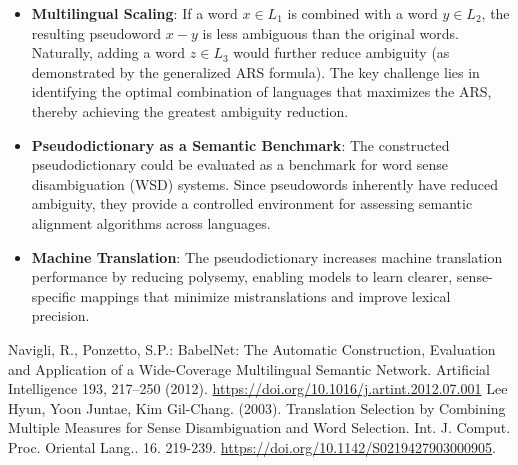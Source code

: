\documentclass[runningheads]{llncs}
\begin{document}
\begin{itemize}
\item \textbf{Multilingual Scaling}: If a word $x \in L_1$ is combined with a word $y \in L_2$, the resulting pseudoword $x-y$ is less ambiguous than the original words. Naturally, adding a word $z \in L_3$ would further reduce ambiguity (as demonstrated by the generalized ARS formula). The key challenge lies in identifying the optimal combination of languages that maximizes the ARS, thereby achieving the greatest ambiguity reduction.
  \item \textbf{Pseudodictionary as a Semantic Benchmark}: The constructed pseudodictionary could be evaluated as a benchmark for word sense disambiguation (WSD) systems. Since pseudowords inherently have reduced ambiguity, they provide a controlled environment for assessing semantic alignment algorithms across languages.
\item \textbf{Machine Translation}: The pseudodictionary increases machine translation performance by reducing polysemy, enabling models to learn clearer, sense-specific mappings that minimize mistranslations and improve lexical precision.
\end{itemize}

\begin{thebibliography}{8}
Navigli, R., Ponzetto, S.P.: BabelNet: The Automatic Construction, Evaluation and Application of a Wide-Coverage Multilingual Semantic Network. Artificial Intelligence 193, 217--250 (2012). \url{https://doi.org/10.1016/j.artint.2012.07.001}
Lee Hyun, Yoon Juntae, Kim Gil-Chang. (2003). Translation Selection by Combining Multiple Measures for Sense Disambiguation and Word Selection. Int. J. Comput. Proc. Oriental Lang.. 16. 219-239. \url{https://doi.org/10.1142/S0219427903000905}. 
\end{thebibliography}
\end{document}
